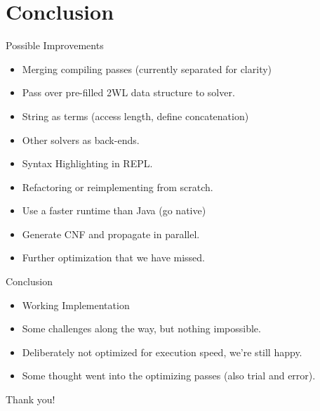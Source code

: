 \documentclass[smaller,dvipsnames,ratio=169]{beamer}
\begin{document}
  \section{Conclusion}

  \begin{frame}{Possible Improvements}
  	\begin{itemize}
  		\item Merging compiling passes (currently separated for clarity)
  		\item Pass over pre-filled 2WL data structure to solver.
  		\item String as terms (access length, define concatenation)
  		\item Other solvers as back-ends.
  		\item Syntax Highlighting in REPL.
  		\item Refactoring or reimplementing from scratch.
  		\item Use a faster runtime than Java (go native)
  		\item Generate CNF and propagate in parallel.
   		\item Further optimization that we have missed.
  	\end{itemize}
  \end{frame}

  \begin{frame}{Conclusion}
  	\begin{itemize}  	
  		\item Working Implementation
  		\item Some challenges along the way, but nothing impossible.
  		\item Deliberately not optimized for execution speed, we're still happy.
  		\item Some thought went into the optimizing passes (also trial and error).
  	\end{itemize}
  \end{frame}

  \begin{frame}[standout]
    Thank you!
  \end{frame}
\end{document}
